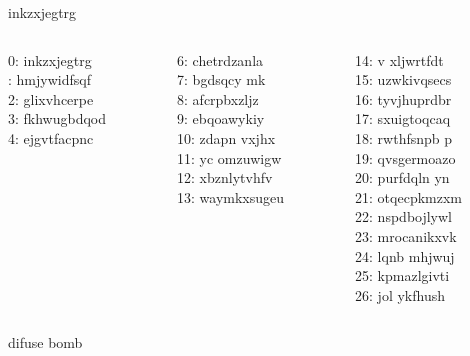 \begin{frame}{}{}
\begin{center}
inkzxjegtrg\ppause
\end{center}
\begin{columns}[t]\small
\begin{column}{0.33\textwidth}
0: inkzxjegtrg\\: hmjywidfsqf\\
2: glixvhcerpe\\
3: fkhwugbdqod\\
4: ejgvtfacpnc\\
\end{column}
\begin{column}{0.33\textwidth}
6: chetrdzanla\\
7: bgdsqcy mk \\
8: afcrpbxzljz\\
9:  ebqoawykiy\\
10: zdapn vxjhx\\
11: yc omzuwigw\\
12: xbznlytvhfv\\
13: waymkxsugeu\\
\end{column}
\begin{column}{0.33\textwidth}
14: v xljwrtfdt\\
15: uzwkivqsecs\\
16: tyvjhuprdbr\\
17: sxuigtoqcaq\\
18: rwthfsnpb p\\
19: qvsgermoazo\\
20: purfdqln yn\\
21: otqecpkmzxm\\
22: nspdbojlywl\\
23: mrocanikxvk\\
24: lqnb mhjwuj\\
25: kpmazlgivti\\
26: jol ykfhush\ppause
\end{column}
\end{columns}
\begin{center}
\ppause
difuse bomb
\end{center}
\end{frame}



